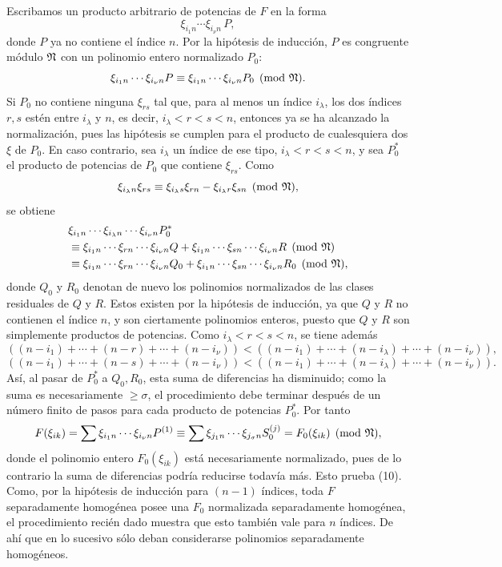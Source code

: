 Escribamos un producto arbitrario de potencias de \(F\) en la forma
\[
        \xi_{i_1n}\cdots\xi_{i_\nu n}\,P,
\]
donde \(P\) ya no contiene el índice \(n\). Por la hipótesis de inducción, \(P\) es congruente módulo \(\mathfrak N\) con un polinomio entero normalizado \(P_0\):
\[
        \xi_{i_1n}\cdots\xi_{i_\nu n}P
        \equiv
        \xi_{i_1n}\cdots\xi_{i_\nu n}P_0
        \pmod{\mathfrak N}.
\]
Si \(P_0\) no contiene ninguna \(\xi_{rs}\) tal que, para al menos un índice \(i_\lambda\), los dos índices \(r,s\) estén entre \(i_\lambda\) y \(n\), es decir, \(i_\lambda<r<s<n\), entonces ya se ha alcanzado la normalización, pues las hipótesis se cumplen para el producto de cualesquiera dos \(\xi\) de \(P_0\). En caso contrario, sea \(i_\lambda\) un índice de ese tipo, \(i_\lambda<r<s<n\), y sea \(P_0^*\) el producto de potencias de \(P_0\) que contiene \(\xi_{rs}\). Como
\[
        \xi_{i_\lambda n}\xi_{rs}\equiv
        \xi_{i_\lambda s}\xi_{rn}-\xi_{i_\lambda r}\xi_{sn}
        \pmod{\mathfrak N},
\]
se obtiene
\begin{align*}
 &\xi_{i_1n}\cdots\xi_{i_\lambda n}\cdots\xi_{i_\nu n}P_0^*\\
 &\equiv
 \xi_{i_1n}\cdots\xi_{rn}\cdots\xi_{i_\nu n}Q
 +
 \xi_{i_1n}\cdots\xi_{sn}\cdots\xi_{i_\nu n}R
 \pmod{\mathfrak N}\\
 &\equiv
 \xi_{i_1n}\cdots\xi_{rn}\cdots\xi_{i_\nu n}Q_0
 +
 \xi_{i_1n}\cdots\xi_{sn}\cdots\xi_{i_\nu n}R_0
 \pmod{\mathfrak N},
\end{align*}
donde \(Q_0\) y \(R_0\) denotan de nuevo los polinomios normalizados de las clases residuales de \(Q\) y \(R\). Estos existen por la hipótesis de inducción, ya que \(Q\) y \(R\) no contienen el índice \(n\), y son ciertamente polinomios enteros, puesto que \(Q\) y \(R\) son simplemente productos de potencias. Como \(i_\lambda<r<s<n\), se tiene además
\[
 ((n-i_1)+\cdots+(n-r)+\cdots+(n-i_\nu))
 <
 ((n-i_1)+\cdots+(n-i_\lambda)+\cdots+(n-i_\nu)),
\]
\[
 ((n-i_1)+\cdots+(n-s)+\cdots+(n-i_\nu))
 <
 ((n-i_1)+\cdots+(n-i_\lambda)+\cdots+(n-i_\nu)).
\]
Así, al pasar de \(P_0^*\) a \(Q_0,R_0\), esta suma de diferencias ha disminuido; como la suma es necesariamente \(\ge\sigma\), el procedimiento debe terminar después de un número finito de pasos para cada producto de potencias \(P_0^*\). Por tanto
\[
        F(\xi_{ik})
        =
        \sum \xi_{i_1n}\cdots\xi_{i_\nu n}P^{(1)}
        \equiv
        \sum \xi_{j_1n}\cdots\xi_{j_\sigma n}S_0^{(j)}
        =
        F_0(\xi_{ik})\pmod{\mathfrak N},
\]
donde el polinomio entero \(F_0(\xi_{ik})\) está necesariamente normalizado, pues de lo contrario la suma de diferencias podría reducirse todavía más. Esto prueba (10). Como, por la hipótesis de inducción para \((n-1)\) índices, toda \(F\) separadamente homogénea posee una \(F_0\) normalizada separadamente homogénea, el procedimiento recién dado muestra que esto también vale para \(n\) índices. De ahí que en lo sucesivo sólo deban considerarse polinomios separadamente homogéneos.

